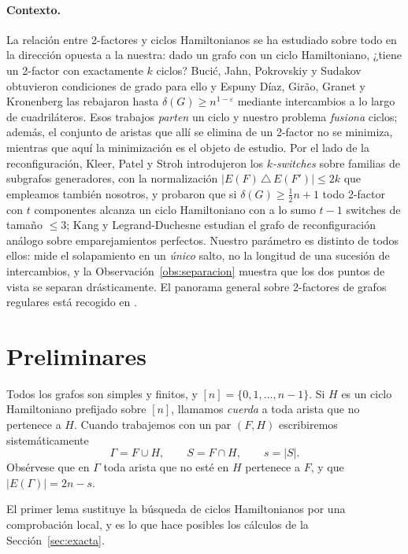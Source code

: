 \documentclass[11pt,a4paper]{article}
\theoremstyle{definition}
\theoremstyle{remark}
\begin{document}
\paragraph{Contexto.} La relación entre 2-factores y ciclos Hamiltonianos se ha estudiado sobre todo en la dirección opuesta a la nuestra: dado un grafo con un ciclo Hamiltoniano, ¿tiene un 2-factor con exactamente $k$ ciclos? Bucić, Jahn, Pokrovskiy y Sudakov \cite{bjps} obtuvieron condiciones de grado para ello y Espuny Díaz, Girão, Granet y Kronenberg \cite{eggk} las rebajaron hasta $\delta(G)\ge n^{1-\varepsilon}$ mediante intercambios a lo largo de cuadriláteros. Esos trabajos \emph{parten} un ciclo y nuestro problema \emph{fusiona} ciclos; además, el conjunto de aristas que allí se elimina de un 2-factor no se minimiza, mientras que aquí la minimización es el objeto de estudio. Por el lado de la reconfiguración, Kleer, Patel y Stroh \cite{kps} introdujeron los \emph{$k$-switches} sobre familias de subgrafos generadores, con la normalización $|E(F)\,\triangle\,E(F')|\le2k$ que empleamos también nosotros, y probaron que si $\delta(G)\ge\frac12n+1$ todo 2-factor con $t$ componentes alcanza un ciclo Hamiltoniano con a lo sumo $t-1$ switches de tamaño $\le3$; Kang y Legrand-Duchesne \cite{kld} estudian el grafo de reconfiguración análogo sobre emparejamientos perfectos. Nuestro parámetro es distinto de todos ellos: mide el solapamiento en un \emph{único} salto, no la longitud de una sucesión de intercambios, y la Observación~\ref{obs:separacion} muestra que los dos puntos de vista se separan drásticamente. El panorama general sobre 2-factores de grafos regulares está recogido en \cite{labbate}.

\section{Preliminares}\label{sec:prelim}

Todos los grafos son simples y finitos, y $[n]=\{0,1,\dots,n-1\}$. Si $H$ es un ciclo Hamiltoniano prefijado sobre $[n]$, llamamos \emph{cuerda} a toda arista que no pertenece a $H$. Cuando trabajemos con un par $(F,H)$ escribiremos sistemáticamente
\[
\Gamma=F\cup H,\qquad S=F\cap H,\qquad s=|S| .
\]
Obsérvese que en $\Gamma$ toda arista que no esté en $H$ pertenece a $F$, y que $|E(\Gamma)|=2n-s$.

El primer lema sustituye la búsqueda de ciclos Hamiltonianos por una comprobación local, y es lo que hace posibles los cálculos de la Sección~\ref{sec:exacta}.
\end{document}
